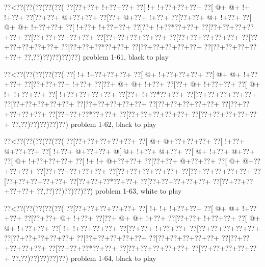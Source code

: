 \vbox{\vbox{\goo
\0??<\0??(\0??(\0??(\0??(\0??(
\0??[\0??+\0??+\- !+\0??+\0??+
\0??[\- !+\- !+\0??+\0??+\0??+
\0??[\- @+\- @+\- !+\- !+\0??+
\0??[\0??+\0??+\- @+\0??+\0??+
\0??[\0??+\- @+\0??+\- !+\0??+
\0??[\0??+\0??+\- @+\- !+\0??+
\0??[\- @+\- @+\- !+\0??+\0??+
\0??[\- !+\0??+\- !+\0??+\0??+
\0??[\0??+\- !+\0??*\0??+\0??+
\0??[\0??+\0??+\0??+\0??+\0??+
\0??[\0??+\0??+\0??+\0??+\0??+
\0??[\0??+\0??+\0??+\0??+\0??+
\0??[\0??+\0??+\0??+\0??+\0??+
\0??[\0??+\0??+\0??+\0??+\0??+
\0??[\0??+\0??+\0??*\0??+\0??+
\0??[\0??+\0??+\0??+\0??+\0??+
\0??[\0??+\0??+\0??+\0??+\0??+
\0??,\0??)\0??)\0??)\0??)\0??)
}
\hfil problem 1-61, black to play\hfil\break
}

\vbox{\vbox{\goo
\0??<\0??(\0??(\0??(\0??(\0??(
\0??[\- !+\- !+\0??+\0??+\0??+
\0??[\- @+\- !+\0??+\0??+\0??+
\0??[\- @+\- @+\- !+\0??+\0??+
\0??[\0??+\0??+\0??+\- !+\0??+
\0??[\0??+\- @+\- @+\- !+\0??+
\0??[\0??+\- @+\- !+\0??+\0??+
\0??[\- @+\- !+\- !+\0??+\0??+
\0??[\- !+\0??+\0??+\0??+\0??+
\0??[\0??+\- !+\0??*\0??+\0??+
\0??[\0??+\0??+\0??+\0??+\0??+
\0??[\0??+\0??+\0??+\0??+\0??+
\0??[\0??+\0??+\0??+\0??+\0??+
\0??[\0??+\0??+\0??+\0??+\0??+
\0??[\0??+\0??+\0??+\0??+\0??+
\0??[\0??+\0??+\0??*\0??+\0??+
\0??[\0??+\0??+\0??+\0??+\0??+
\0??[\0??+\0??+\0??+\0??+\0??+
\0??,\0??)\0??)\0??)\0??)\0??)
}
\hfil problem 1-62, black to play\hfil\break
}

\vbox{\vbox{\goo
\0??<\0??(\0??(\0??(\0??(\0??(
\0??[\0??+\0??+\0??+\0??+\0??+
\0??[\- @+\- @+\0??+\0??+\0??+
\0??[\- !+\0??+\- @+\0??+\0??+
\0??[\- !+\0??+\- @+\0??+\0??+
\- @[\- @+\- !+\0??+\- @+\0??+
\0??[\- @+\- !+\0??+\- @+\0??+
\0??[\- @+\- !+\0??+\0??+\0??+
\0??[\- !+\- !+\- @+\0??+\0??+
\0??[\0??+\0??+\- @+\0??+\0??+
\0??[\- @+\- @+\0??+\0??+\0??+
\0??[\0??+\0??+\0??+\0??+\0??+
\0??[\0??+\0??+\0??+\0??+\0??+
\0??[\0??+\0??+\0??+\0??+\0??+
\0??[\0??+\0??+\0??+\0??+\0??+
\0??[\0??+\0??+\0??*\0??+\0??+
\0??[\0??+\0??+\0??+\0??+\0??+
\0??[\0??+\0??+\0??+\0??+\0??+
\0??,\0??)\0??)\0??)\0??)\0??)
}
\hfil problem 1-63, white to play\hfil\break
}

\vbox{\vbox{\goo
\0??<\0??(\0??(\0??(\0??(\0??(
\0??[\0??+\0??+\0??+\0??+\0??+
\0??[\- !+\- !+\- !+\0??+\0??+
\0??[\- @+\- @+\- !+\0??+\0??+
\0??[\0??+\0??+\- @+\- !+\0??+
\0??[\0??+\- @+\- @+\- !+\0??+
\0??[\0??+\0??+\- !+\0??+\0??+
\0??[\- @+\- @+\- !+\0??+\0??+
\0??[\- !+\- !+\0??+\0??+\0??+
\0??[\0??+\0??+\- !+\0??+\0??+
\0??[\0??+\0??+\0??+\0??+\0??+
\0??[\0??+\0??+\0??+\0??+\0??+
\0??[\0??+\0??+\0??+\0??+\0??+
\0??[\0??+\0??+\0??+\0??+\0??+
\0??[\0??+\0??+\0??+\0??+\0??+
\0??[\0??+\0??+\0??*\0??+\0??+
\0??[\0??+\0??+\0??+\0??+\0??+
\0??[\0??+\0??+\0??+\0??+\0??+
\0??,\0??)\0??)\0??)\0??)\0??)
}
\hfil problem 1-64, black to play\hfil\break
}

